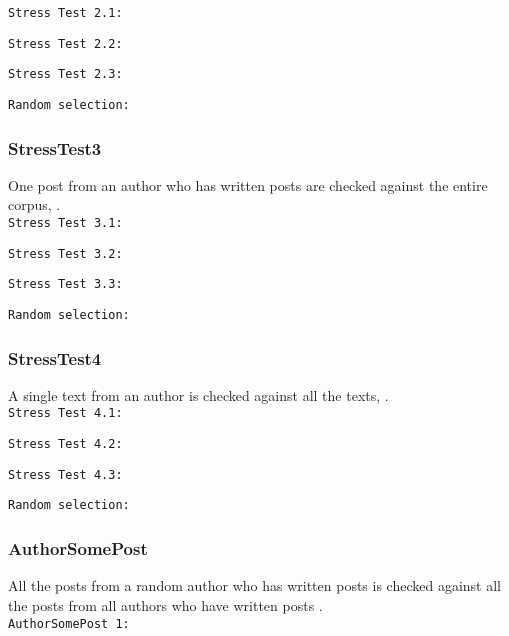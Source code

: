 \texttt{Stress Test 2.1:}\nl
\nl

\texttt{Stress Test 2.2:}\nl
\nl

\texttt{Stress Test 2.3:}\nl
\nl

\texttt{Random selection:}\nl


\subsubsection{StressTest3}
One post from an author who has written  posts are checked against the entire corpus, .\\

\texttt{Stress Test 3.1:}\nl
\nl

\texttt{Stress Test 3.2:}\nl
\nl

\texttt{Stress Test 3.3:}\nl
\nl

\texttt{Random selection:}\nl


\subsubsection{StressTest4}
A single text from an author is checked against all the texts,  .\\

\texttt{Stress Test 4.1:}\nl
\nl

\texttt{Stress Test 4.2:}\nl
\nl

\texttt{Stress Test 4.3:}\nl
\nl

\texttt{Random selection:}\nl


\subsubsection{AuthorSomePost}
All the posts from a random author who has written  posts is checked against all the posts from all authors who have written  posts .\\  

\texttt{AuthorSomePost 1:}\nl
\nl

